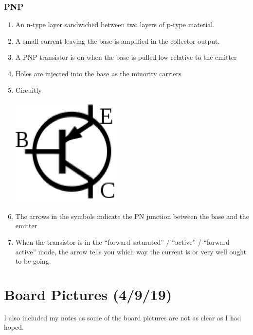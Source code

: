 \documentclass[11pt]{book}
\begin{document}
\subsubsection{PNP}
\begin{enumerate}
	\item An n-type layer sandwiched between two layers of p-type material.
	\item A small current leaving the base is amplified in the collector output.
	\item A PNP transistor is on when the base is pulled low relative to the emitter
	\item Holes are injected into the base as the minority carriers
	\item Circuitly
	\begin{center}
		\includegraphics{figures/20.21.png}
	\end{center}
	\item The arrows in the symbols indicate the PN junction between the base and the emitter
	\item When the transistor is in the ``forward saturated'' / ``active'' / ``forward active'' mode, the arrow tells you which way the current is or very well ought to be going.
\end{enumerate}



\section{Board Pictures (4/9/19)}
I also included my notes as some of the board pictures are not as clear as I had hoped.

\end{document}
